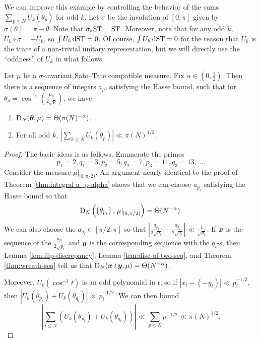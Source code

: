 We can improve this example by controlling the behavior of the sums 
$\sum_{p\leqslant N} U_k(\theta_p)$ for odd $k$. Let $\sigma$ be 
the involution of $[0,\pi]$ given by $\sigma(\theta) = \pi-\theta$. Note that 
$\sigma_\ast \mathrm{ST} = \mathrm{ST}$. Moreover, note that for any odd $k$, 
$U_k\circ\sigma = - U_k$, so $\int U_k\, \mathrm{d}\mathrm{ST} = 0$. Of course, 
$\int U_k \,\mathrm{d}\mathrm{ST} = 0$ for the reason that $U_k$ is the trace of a 
non-trivial unitary representation, but we will directly use the ``oddness'' 
of $U_k$ in what follows.

\begin{theorem}\label{thm:int-flip-seq}
Let $\mu$ be a $\sigma$-invariant Sato--Tate compatible measure. Fix 
$\alpha\in \left(0,\frac 1 2\right)$. Then there is a sequence of integers 
$a_p$, satisfying the Hasse bound, such that for 
$\theta_p =\cos^{-1}\left( \frac{a_p}{2\sqrt p}\right)$, we have
\begin{enumerate}
\item
$\operatorname{D}_N({\boldsymbol\theta},\mu) = \Theta(\pi(N)^{-\alpha})$. 

\item
For all odd $k$, 
$\left| \sum_{k\leqslant N} U_k(\theta_p)\right| \ll \pi(N)^{1/2}$. 
\end{enumerate}
\end{theorem}
\begin{proof}
The basic ideas is as follows. Enumerate the primes 
\[
	p_1 = 2, q_1 = 3, p_2 = 5, q_2 = 7, p_3 = 11, q_3 = 13, \dots .
\]
Consider the measure $\left.\mu\right|_{[0,\pi/2)}$. An argument 
nearly identical to the proof of Theorem \ref{thm:integral-a_p-alpha} shows 
that we can choose $a_{p_i}$ satisfying the Hasse bound so that 
\[
	\operatorname{D}_N\left( \left\{\theta_{p_i}\right\},\left.\mu\right|_{[0,\pi/2)}\right) = \Theta(N^{-\alpha}) .
\]
We can also choose the $a_{q_i}\in [\pi/2,\pi]$ so that 
$\left| \frac{a_{p_i}}{2\sqrt{p_i}} + \frac{a_{q_i}}{2\sqrt{q_i}}\right| \ll \frac{1}{\sqrt{p_i}}$. 
If ${\boldsymbol x}$ is the sequence of the $\frac{a_{p_i}}{2\sqrt{p_i}}$ and ${\boldsymbol y}$ is 
the corresponding sequence with the $q_i$-s, then Lemma 
\ref{lem:flip-discrepancy}, Lemma \ref{lem:disc-of-two-seq}, and Theorem 
\ref{thm:wreath-seq} tell us that $\operatorname{D}_N({\boldsymbol x}\wr{\boldsymbol y},\mu) = \Theta(N^{-\alpha})$. 

Moreover, $U_k(\cos^{-1} t)$ is an odd polynomial in $t$, so if 
$|x_i - (-y_i)| \ll p_i^{-1/2}$, then 
$|U_k(\theta_{p_i}) + U_k(\theta_{q_i})| \ll p_i^{-1/2}$. We can then bound 
\[
	\left| \sum_{i\leqslant N} \left(U_k(\theta_{p_i}) + U_k(\theta_{q_i})\right)\right| \ll \sum_{p\leqslant N} p^{-1/2} \ll \pi(N)^{1/2} .
\]
\end{proof}


